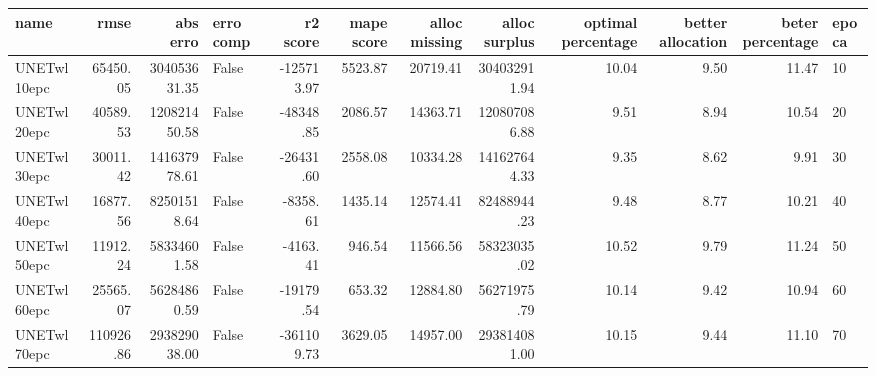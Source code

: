 \begin{tabular}{lrrlrrrrrrrl}
\toprule
name & rmse & abs erro & erro comp & r2 score & mape score & alloc missing & alloc surplus & optimal percentage & better allocation & beter percentage & epoca \\
\midrule
UNETwl10epc & 65450.05 & 304053631.35 & False & -125713.97 & 5523.87 & 20719.41 & 304032911.94 & 10.04 & 9.50 & 11.47 & 10 \\
UNETwl20epc & 40589.53 & 120821450.58 & False & -48348.85 & 2086.57 & 14363.71 & 120807086.88 & 9.51 & 8.94 & 10.54 & 20 \\
UNETwl30epc & 30011.42 & 141637978.61 & False & -26431.60 & 2558.08 & 10334.28 & 141627644.33 & 9.35 & 8.62 & 9.91 & 30 \\
UNETwl40epc & 16877.56 & 82501518.64 & False & -8358.61 & 1435.14 & 12574.41 & 82488944.23 & 9.48 & 8.77 & 10.21 & 40 \\
UNETwl50epc & 11912.24 & 58334601.58 & False & -4163.41 & 946.54 & 11566.56 & 58323035.02 & 10.52 & 9.79 & 11.24 & 50 \\
UNETwl60epc & 25565.07 & 56284860.59 & False & -19179.54 & 653.32 & 12884.80 & 56271975.79 & 10.14 & 9.42 & 10.94 & 60 \\
UNETwl70epc & 110926.86 & 293829038.00 & False & -361109.73 & 3629.05 & 14957.00 & 293814081.00 & 10.15 & 9.44 & 11.10 & 70 \\
\bottomrule
\end{tabular}
